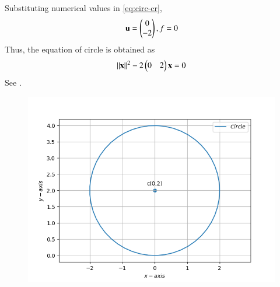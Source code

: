 Substituting numerical values in 
	\eqref{eq:circ-cr},
\begin{align}
	\mathbf{u} = \begin{pmatrix}0\\-2\end{pmatrix},
	f 
	  = 0
\end{align}
Thus, the equation of circle is obtained as
\begin{align}
	\left\lVert\mathbf{x}\right\rVert^2 - 2\begin{pmatrix}0 & 2\end{pmatrix}\mathbf{x} = 0
\end{align}
See .
\begin{figure}[!h]
	\begin{center} 
	    \includegraphics[width=\columnwidth]{chapters/11/11/1/1/figs/circ1}
	\end{center}
\caption{}
\label{fig:11/11/1/1/Fig1}
\end{figure}

